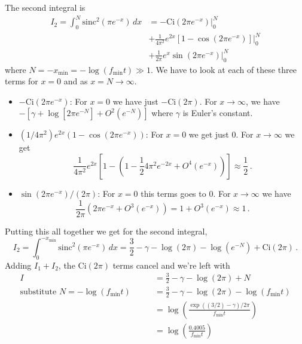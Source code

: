The second integral is
\begin{align*}
  I_2 = \int_0^{N}\text{sinc}^2 \left(\pi e^{-x}\right)\, dx
  & = -\text{Ci}(2\pi e^{-x})|_0^N \\
  &+ \frac{1}{4\pi^{2}}e^{2x}\left[1-\cos\left(2\pi e^{-x}\right)\right]|_{0}^{N} \\
  &+ \frac{1}{2\pi}e^{x}\sin\left(2\pi e^{-x}\right)|_{0}^{N}
\end{align*}
where $N = -x_\text{min} = -\log(f_\text{min} t) \gg 1$.
We have to look at each of these three terms for $x=0$ and as $x=N\rightarrow\infty$.

\begin{itemize}

  \item $-\text{Ci}(2\pi e^{-x})$: For $x=0$ we have just $-\text{Ci}(2\pi)$.
  For $x \rightarrow \infty$, we have $-\left[\gamma+\log\left[2\pi e^{-N}\right]+O^{2}(e^{-N})\right]$ where $\gamma$ is Euler's constant.

  \item $(1/4\pi^2) e^{2x}\left(1-\cos(2\pi e^{-x})\right)$: For $x=0$ we get just 0.
    For $x \rightarrow \infty$ we get
    \begin{equation*}
      \frac{1}{4 \pi^2} e^{2x} \left[ 1 - \left( 1 - \frac{1}{2} 4 \pi^2 e^{-2x} + O^4 (e^{-x}) \right) \right] \approx \frac{1}{2} \, .
    \end{equation*}

  \item $\sin \left(2 \pi e^{-x}\right) / (2\pi)$: For $x=0$ this terms goes to 0.
    For $x \rightarrow \infty$ we have
    \begin{equation*}
      \frac{1}{2 \pi} \left(2 \pi e^{-x} + O^3(e^{-x}) \right) = 1 + O^3(e^{-x}) \approx 1 \, .
    \end{equation*}
\end{itemize}
Putting this all together we get for the second integral,
\begin{equation}
  I_2 = \int_0^{-x_\text{min}}\text{sinc}^2 \left( \pi e^{-x} \right)\, dx
  = \frac{3}{2} -\gamma -\log \left(2\pi \right) - \log\left( e^{-N} \right) + \text{Ci}\left(2\pi\right) \, .
\end{equation}
Adding $I_1 + I_2$, the $\text{Ci}(2\pi)$ terms cancel and we're left with
\begin{align}
  I
  & = \frac{3}{2}-\gamma - \log\left(2\pi\right) + N \nonumber \\
  \text{substitute } N = - \log\left(f_\text{min}t\right) \qquad
  & = \frac{3}{2} - \gamma - \log\left(2\pi\right) - \log\left( f_\text{min}t \right) \nonumber \\
  & = \log\left(\frac{\exp((3/2) - \gamma) / 2\pi}{f_\text{min} t} \right) \nonumber \\
  & = \log\left(\frac{0.4005}{f_\text{min}t}\right)
\end{align}
